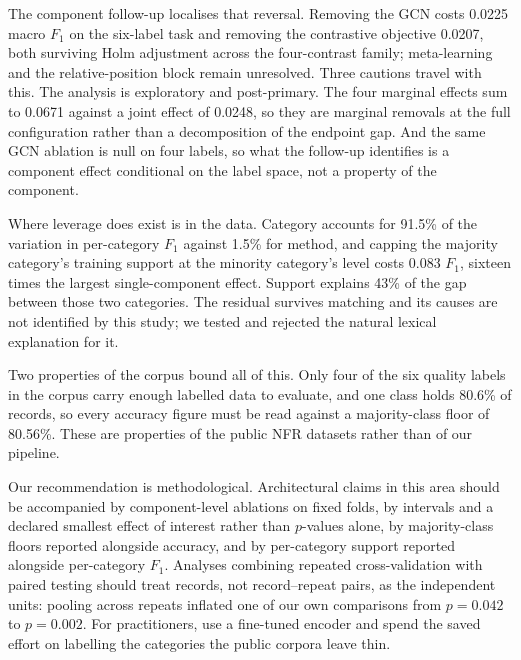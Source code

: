 \documentclass[11pt,a4paper]{article}
\begin{document}
The component follow-up localises that reversal. Removing the GCN costs 0.0225 macro $F_1$ on the
six-label task and removing the contrastive objective 0.0207, both surviving Holm adjustment across the
four-contrast family; meta-learning and the relative-position block remain unresolved. Three cautions
travel with this. The analysis is exploratory and post-primary. The four marginal effects sum to 0.0671
against a joint effect of 0.0248, so they are marginal removals at the full configuration rather than a
decomposition of the endpoint gap. And the same GCN ablation is null on four labels, so what the follow-up
identifies is a component effect conditional on the label space, not a property of the component.

Where leverage does exist is in the data. Category accounts for 91.5\% of the variation in
per-category $F_1$ against 1.5\% for method, and capping the majority category's training
support at the minority category's level costs 0.083 $F_1$, sixteen times the largest
single-component effect. Support explains 43\% of the gap between those two categories. The residual survives
matching and its causes are not identified by this study; we tested and rejected the natural
lexical explanation for it.

Two properties of the corpus bound all of this. Only four of the six quality labels in the corpus
carry enough labelled data to evaluate, and one class holds 80.6\% of records, so every
accuracy figure must be read against a majority-class floor of 80.56\%. These are properties
of the public NFR datasets rather than of our pipeline.

Our recommendation is methodological. Architectural claims in this area should be accompanied
by component-level ablations on fixed folds, by intervals and a declared smallest effect of
interest rather than $p$-values alone, by majority-class floors reported alongside accuracy,
and by per-category support reported alongside per-category $F_1$. Analyses combining
repeated cross-validation with paired testing should treat records, not record--repeat pairs,
as the independent units: pooling across repeats inflated one of our own comparisons from
$p = 0.042$ to $p = 0.002$. For practitioners, use a fine-tuned encoder and spend the saved
effort on labelling the categories the public corpora leave thin.

\end{document}
